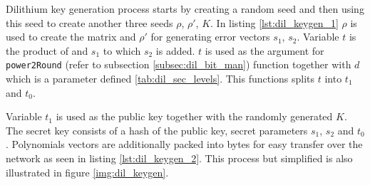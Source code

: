 Dilithium key generation process starts by creating a random seed and then using this seed to create another three seeds $\rho$, $\rho'$, $K$. In listing \ref{lst:dil_keygen_1} $\rho$ is used to create the matrix  and $\rho'$ for generating error vectors $s_1$, $s_2$. Variable $t$ is the product of  and $s_1$ to which $s_2$ is added. $t$ is used as the argument for \texttt{power2Round} (refer to subsection \ref{subsec:dil_bit_man}) function together with $d$ which is a parameter defined \ref{tab:dil_sec_levels}. This functions splits $t$ into $t_1$ and $t_0$.

Variable $t_1$ is used as the public key together with the randomly generated $K$. The secret key consists of a hash of the public key, secret parameters $s_1$, $s_2$ and $t_0$. Polynomials vectors are additionally packed into bytes for easy transfer over the network as seen in listing \ref{lst:dil_keygen_2}. This process but simplified is also illustrated in figure \ref{img:dil_keygen}.

